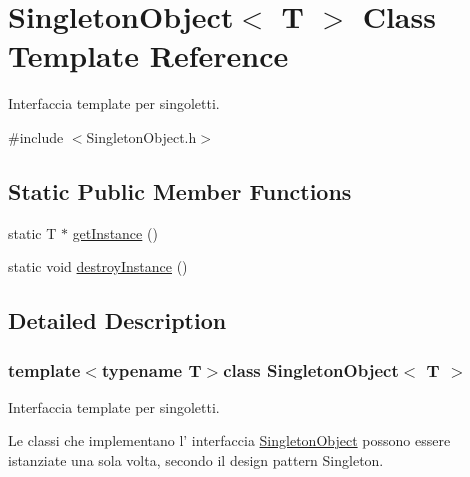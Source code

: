 \hypertarget{class_singleton_object}{
\section{SingletonObject$<$ T $>$ Class Template Reference}
\label{class_singleton_object}
}


Interfaccia template per singoletti.  




{\ttfamily \#include $<$SingletonObject.h$>$}

\subsection*{Static Public Member Functions}
\begin{DoxyCompactItemize}
\item 
static T $\ast$ \hyperlink{class_singleton_object_a7f2d6cfb89b33f7610f26081f54f2c58}{getInstance} ()
\item 
static void \hyperlink{class_singleton_object_a9a47611170156db4e0a70ba5fee69eb4}{destroyInstance} ()
\end{DoxyCompactItemize}


\subsection{Detailed Description}
\subsubsection*{template$<$typename T$>$class SingletonObject$<$ T $>$}

Interfaccia template per singoletti. 

Le classi che implementano l' interfaccia \hyperlink{class_singleton_object}{SingletonObject} possono essere istanziate una sola volta, secondo il design pattern Singleton. 

